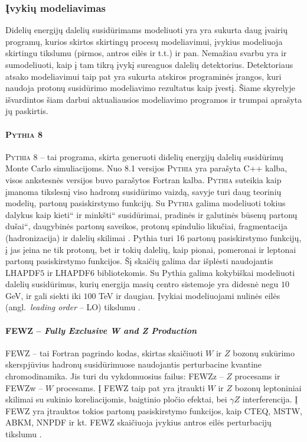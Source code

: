 \documentclass[a4paper, 12pt]{article}
\newcommand{\ltq}[1]{{\quotedblbase{}#1\textquotedblleft{}}}
\newlength\q
\begin{document}
\subsubsection{Įvykių modeliavimas}
Didelių energijų dalelių susidūrimams modeliuoti yra yra sukurta daug įvairių programų, kurios skirtos skirtingų procesų modeliavimui, įvykius modeliuoja skirtingu tikslumu (pirmos, antros eilės ir t.t.) ir pan. Nemažiau svarbu yra ir sumodeliuoti, kaip į tam tikrą įvykį sureaguos dalelių detektorius. Detektoriaus atsako modeliavimui taip pat yra sukurta atskiros programinės įrangos, kuri naudoja protonų susidūrimo modeliavimo rezultatus kaip įvestį. Šiame skyrelyje išvardintos šiam darbui aktualiausios modeliavimo programos ir trumpai aprašyta jų paskirtis.
\paragraph{\textsc{Pythia} 8\\}
\textsc{Pythia} 8 -- tai programa, skirta generuoti didelių energijų dalelių susidūrimų Monte Carlo simuliacijoms. Nuo 8.1 versijos \textsc{Pythia} yra parašyta C++ kalba, visos ankstesnės versijos buvo parašytos Fortran kalba. \textsc{Pythia} suteikia kaip įmanoma tikslesnį viso hadronų susidūrimo vaizdą, savyje turi daug teorinių modelių, partonų pasiskirstymo funkcijų. Su \textsc{Pythia} galima modeliuoti tokius dalykus kaip \ltq{kieti} ir \ltq{minkšti} susidūrimai, pradinės ir galutinės būsenų partonų \ltq{dušai}, daugybinės partonų saveikos, protonų spindulio likučiai, fragmentacija (hadronizacija) ir dalelių skilimai \cite{pythia81}. Pythia turi 16 partonų pasiskirstymo funkcijų, į jas įeina ne tik protonų, bet ir tokių dalelių, kaip pionai, pomeronai ir leptonai partonų pasiskirstymo funkcijos. Šį skaičių galima dar išplėsti naudojantis LHAPDF$5$ ir LHAPDF$6$ bibliotekomis.
Su Pythia galima kokybiškai modeliuoti dalelių susidūrimus, kurių energija masių centro sistemoje yra didesnė negu $10$ GeV, ir gali siekti iki $100$ TeV ir daugiau. Įvykiai modeliuojami nulinės eilės (angl.\ \textit{leading order} -- LO) tikslumu \cite{pythia82}.

\paragraph{FEWZ -- \textit{Fully Exclusive W and Z Production}\\}
FEWZ -- tai Fortran pagrindo kodas, skirtas skaičiuoti $W$ ir $Z$ bozonų sukūrimo skerspjūvius hadronų susidūrimuose naudojantis perturbacine kvantine chromodinamika. Jis turi du vykdomuosius failus: FEWZz -- $Z$ procesams ir FEWZw -- $W$ procesams. Į FEWZ taip pat yra įtraukti $W$ ir $Z$ bozonų leptoniniai skilimai su sukinio koreliacijomis, baigtinio pločio efektai, bei $\gamma Z$ interferencija. Į FEWZ yra įtrauktos tokios partonų pasiskirstymo funkcijos, kaip CTEQ, MSTW, ABKM, NNPDF ir kt. FEWZ skaičiuoja įvykius antros eilės perturbacijų tikslumu \cite{fewz}.
\end{document}

